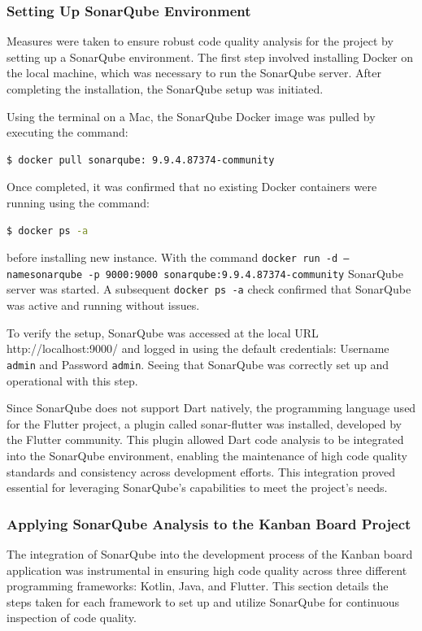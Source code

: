 \subsubsection{Setting Up SonarQube Environment}
Measures were taken to ensure robust code quality analysis for the project by setting up a SonarQube environment. The first step involved installing Docker on the local machine, which was necessary to run the SonarQube server. After completing the installation, the SonarQube setup was initiated.
\par
Using the terminal on a Mac, the SonarQube Docker \cite{Docker} image was pulled by executing the command:
\begin{lstlisting}[language=bash]
    $ docker pull sonarqube: 9.9.4.87374-community 
  \end{lstlisting}
  Once completed, it was confirmed that no existing Docker containers were running using the command:
\begin{lstlisting}[language=bash]
    $ docker ps -a 
\end{lstlisting}
before installing new instance. With the command \texttt{docker run -d — name\newline sonarqube -p 9000:9000 sonarqube:9.9.4.87374-community} SonarQube server was started. A subsequent \texttt{docker ps -a} check confirmed that SonarQube was active and running without issues.
\par
To verify the setup, SonarQube was accessed at the local URL http://localhost:9000/ and logged in using the default credentials: Username \texttt{admin} and Password \texttt{admin}. Seeing that SonarQube was correctly set up and operational with this step.
\par
Since SonarQube does not support Dart natively, the programming language used for the Flutter project, a plugin called sonar-flutter \cite{flutter_sonar} was installed, developed by the Flutter community. This plugin allowed Dart code analysis to be integrated into the SonarQube environment, enabling the maintenance of high code quality standards and consistency across development efforts. This integration proved essential for leveraging SonarQube's capabilities to meet the project's needs.
\subsubsection{Applying SonarQube Analysis to the Kanban Board Project}
The integration of SonarQube into the development process of the Kanban board application was instrumental in ensuring high code quality across three different programming frameworks: Kotlin, Java, and Flutter. This section details the steps taken for each framework to set up and utilize SonarQube for continuous inspection of code quality.

